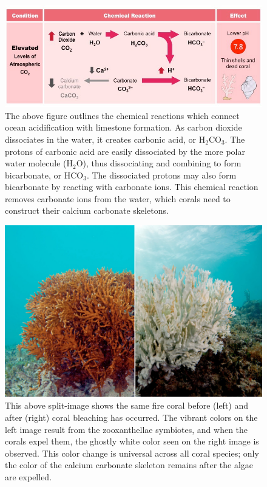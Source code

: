 \documentclass{book}\usepackage{knitr}
\begin{document}
{\begin{figure}
\includegraphics[width=\linewidth]{images/acidification2_med}
\caption{The above figure outlines the chemical reactions which connect ocean acidification with limestone formation. As carbon dioxide dissociates in the water, it creates carbonic acid, or H$_2$CO$_3$. The protons of carbonic acid are easily dissociated by the more polar water molecule (H$_2$O), thus dissociating and combining to form bicarbonate, or HCO$_3$. The dissociated protons may also form bicarbonate by reacting with carbonate ions. This chemical reaction removes carbonate ions from the water, which corals need to construct their calcium carbonate skeletons.}
\label{fig:Ocean Acidifcation Chemical Reaction and Its Carbonate Relation}
\end{figure}

\begin{figure}
\includegraphics[width=\linewidth]{images/coralbleach}
\caption{This above split-image shows the same fire coral before (left) and after (right) coral bleaching has occurred. The vibrant colors on the left image result from the zooxanthellae symbiotes, and when the corals expel them, the ghostly white color seen on the right image is observed. This color change is universal across all coral species; only the color of the calcium carbonate skeleton remains after the algae are expelled.}
\label{fig:Coral Bleaching}
\end{figure}

}
\end{document}
